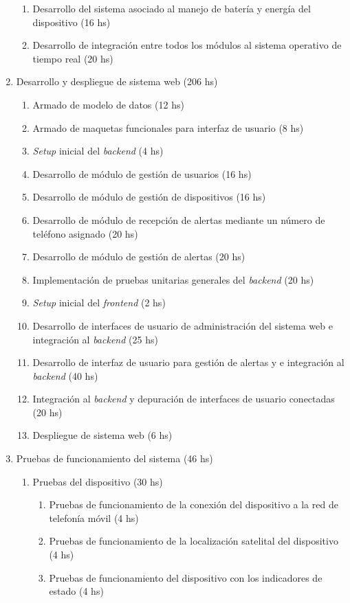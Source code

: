 \documentclass[
11pt, %
]{charter}
\begin{document}
\begin{enumerate}
\begin{enumerate}
	\item Desarrollo del sistema asociado al manejo de batería y energía del dispositivo (16 hs)
	\item Desarrollo de integración entre todos los módulos al sistema operativo de tiempo real (20 hs)
	\end{enumerate}
\item Desarrollo y despliegue de sistema web (206 hs)
	\begin{enumerate}
	\item Armado de modelo de datos (12 hs)
	\item Armado de maquetas funcionales para interfaz de usuario (8 hs)
	\item \textit{Setup} inicial del \textit{backend} (4 hs)
	\item Desarrollo de módulo de gestión de usuarios (16 hs)
	\item Desarrollo de módulo de gestión de dispositivos (16 hs)
	\item Desarrollo de módulo de recepción de alertas mediante un número de teléfono asignado (20 hs)
	\item Desarrollo de módulo de gestión de alertas (20 hs)
	\item Implementación de pruebas unitarias generales del \textit{backend} (20 hs)
	\item \textit{Setup} inicial del \textit{frontend} (2 hs)
	\item Desarrollo de interfaces de usuario de administración del sistema web e integración al \textit{backend} (25 hs)
	\item Desarrollo de interfaz de usuario para gestión de alertas y e integración al \textit{backend} (40 hs)
	\item Integración al \textit{backend} y depuración de interfaces de usuario conectadas (20 hs)
	\item Despliegue de sistema web (6 hs)
	\end{enumerate}
\item Pruebas de funcionamiento del sistema (46 hs)
	\begin{enumerate}
	\item Pruebas del dispositivo (30 hs)
	    \begin{enumerate}
	    \item Pruebas de funcionamiento de la conexión del dispositivo a la red de telefonía móvil (4 hs)
	    \item Pruebas de funcionamiento de la localización satelital del dispositivo (4 hs)
	    \item Pruebas de funcionamiento del dispositivo con los indicadores de estado (4 hs)

\end{enumerate}
\end{enumerate}
\end{enumerate}
\end{document}
